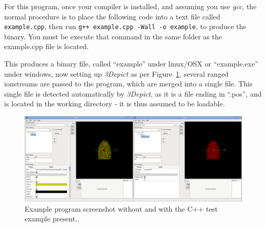 \documentclass[10pt]{article}
\begin{document}
For this program, once your compiler is installed, and assuming you use \emph{gcc}, the normal procedure is to place the following code into a text file called \texttt{example.cpp}, then run \texttt{g++ example.cpp -Wall -o example}, to produce the binary. You must be execute that command in the same folder as the example.cpp file is located. 

This produces a binary file, called ``example'' under linux/OSX or ``example.exe'' under windows, now setting up \emph{3Depict} as per Figure~\ref{fig:externalProgCppSample}, several ranged ionstreams are passed to the program, which are merged into a single file. This single file is detected automatically by \emph{3Depict}, as it is a file ending in ``.pos'', and is located in the working directory - it is thus assumed to be loadable.

\begin{figure}
\begin{center}
 \includegraphics[keepaspectratio=true,width=0.85 \textwidth]{./figures/externalProgCpp.png}
 \caption{Example program screenshot without and with the C++ test example present..}
 \label{fig:externalProgCppSample}
\end{center}
\end{figure}
\end{document}
